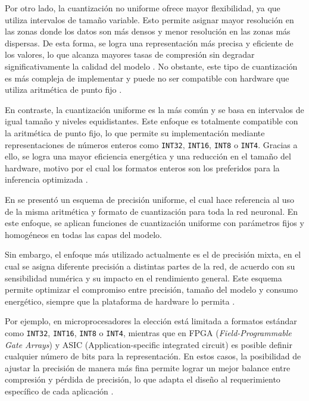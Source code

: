 Por otro lado, la cuantización no uniforme ofrece mayor flexibilidad, ya que utiliza intervalos de tamaño variable. Esto permite asignar mayor resolución en las zonas donde los datos son más densos y menor resolución en las zonas más dispersas. De esta forma, se logra una representación más precisa y eficiente de los valores, lo que alcanza mayores tasas de compresión sin degradar significativamente la calidad del modelo \cite{banner2019posttraining4bitquantizationconvolution}. No obstante, este tipo de cuantización es más compleja de implementar y puede no ser compatible con hardware que utiliza aritmética de punto fijo \cite{banner2019posttraining4bitquantizationconvolution}.

En contraste, la cuantización uniforme es la más común y se basa en intervalos de igual tamaño y niveles equidistantes. Este enfoque es totalmente compatible con la aritmética de punto fijo, lo que permite su implementación mediante representaciones de números enteros como \texttt{INT32}, \texttt{INT16}, \texttt{INT8} o \texttt{INT4}. Gracias a ello, se logra una mayor eficiencia energética y una reducción en el tamaño del hardware, motivo por el cual los formatos enteros son los preferidos para la inferencia optimizada \cite{Jacob2018}.

En \cite{Krishnamoorthi2018} se presentó un esquema de precisión uniforme, el cual hace referencia al uso de la misma aritmética y formato de cuantización para toda la red neuronal. En este enfoque, se aplican funciones de cuantización uniforme con parámetros fijos y homogéneos en todas las capas del modelo.

Sin embargo, el enfoque más utilizado actualmente es el de precisión mixta, en el cual se asigna diferente precisión a distintas partes de la red, de acuerdo con su sensibilidad numérica y su impacto en el rendimiento general. Este esquema permite optimizar el compromiso entre precisión, tamaño del modelo y consumo energético, siempre que la plataforma de hardware lo permita \cite{Micikevicius2018}.

Por ejemplo, en microprocesadores la elección está limitada a formatos estándar como \texttt{INT32}, \texttt{INT16}, \texttt{INT8} o \texttt{INT4}, mientras que en FPGA (\textit{Field-Programmable Gate Arrays}) y ASIC (Application-specific integrated circuit) es posible definir cualquier número de bits para la representación. En estos casos, la posibilidad de ajustar la precisión de manera más fina permite lograr un mejor balance entre compresión y pérdida de precisión, lo que adapta el diseño al requerimiento específico de cada aplicación \cite{Han2016}.

